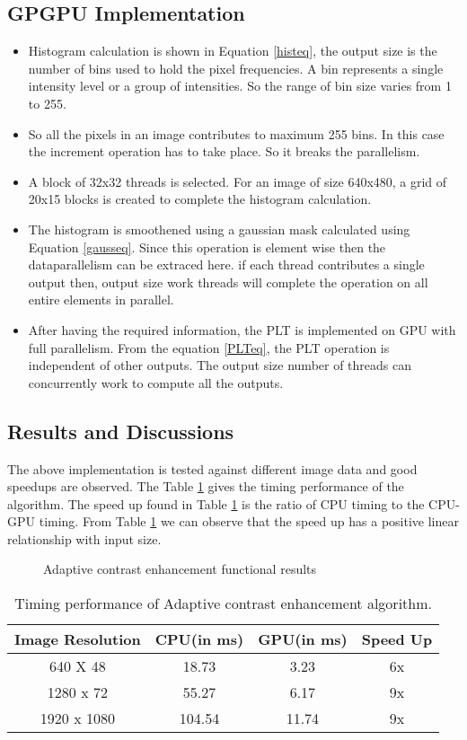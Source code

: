 \subsection{GPGPU Implementation}
\begin{itemize}	
		\item Histogram calculation is shown in Equation \ref{histeq}, the output size is the number of bins used to hold the pixel frequencies. A bin represents a single intensity level or a group of intensities. So the range of bin size varies from 1 to 255.
		\item So all the pixels in an image contributes to maximum 255 bins. In this case the increment operation has to take place. So it breaks the parallelism.
		\item A block of 32x32 threads is selected. For an image of size 640x480,  a grid of 20x15 blocks is created to complete the histogram calculation.
		\item The histogram is smoothened using a gaussian mask calculated using Equation \ref{gausseq}. 
		Since this operation is element wise then the dataparallelism can be extraced here. if each thread contributes a single output then, output size work threads will complete the operation on all entire elements in parallel.
		 \item After having the required information, the PLT is implemented on GPU with full parallelism. From the equation \ref{PLTeq}, the PLT operation is independent of other outputs. The output size number of threads can concurrently work to compute all the outputs.
\end{itemize}
\subsection{Results and Discussions}
The above implementation is tested against different image data and good speedups are observed. The Table \ref{timing of ace} gives the timing performance of the algorithm. The speed up found in Table \ref{timing of ace} is the ratio of CPU timing to the CPU-GPU timing. From Table \ref{timing of ace} we can observe that the speed up has a positive linear relationship with input size. 
\begin{figure}[htb]
\centering
{}%
\qquad
{}%
\caption{Adaptive contrast enhancement functional results}%
\label{fig:ace results}%
\end{figure}
\begin{table}[htb]
\centering
\begin{tabular}{ |c|c|c|c| }
\hline
\textbf{Image Resolution} & \textbf{CPU(in ms)} &  \textbf{GPU(in ms)} & \textbf{Speed Up}\\
\hline
640 X 48 & 18.73 & 3.23 & 6x \\
\hline
1280 x 72 & 55.27 & 6.17 & 9x \\
\hline
1920 x 1080 & 104.54 & 11.74 & 9x \\
\hline
\end{tabular}
\caption{Timing performance of Adaptive contrast enhancement algorithm.}
\label{timing of ace}
\end{table}
